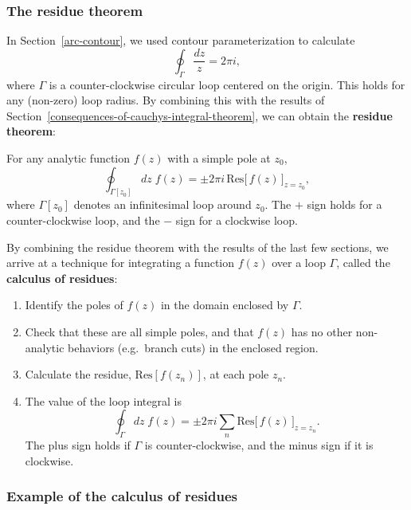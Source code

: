 \documentclass[10pt,a4paper]{article}
\begin{document}
\subsubsection{The residue theorem}
\label{the-residue-theorem}

In Section~\ref{arc-contour}, we used contour parameterization to
calculate
\begin{equation}
\oint_{\Gamma} \frac{dz}{z} = 2\pi i,
\end{equation}
where $\Gamma$ is a counter-clockwise circular loop centered on the
origin. This holds for any (non-zero) loop radius. By combining this
with the results of
Section~\ref{consequences-of-cauchys-integral-theorem}, we can obtain
the \textbf{residue theorem}:

\begin{framed}
  \noindent
  For any analytic function $f(z)$ with a simple pole at $z_0$,
  \begin{equation}
    \oint_{\Gamma[z_0]} dz \; f(z) = \pm 2\pi i \, \mathrm{Res}\big[\,f(z)\,\big]_{z = z_0},
  \end{equation}
  where $\Gamma[z_0]$ denotes an infinitesimal loop around $z_0$. The
  $+$ sign holds for a counter-clockwise loop, and the $-$ sign for a
  clockwise loop.
\end{framed}

\noindent
By combining the residue theorem with the results of the last few
sections, we arrive at a technique for integrating a function $f(z)$
over a loop $\Gamma$, called the \textbf{calculus of residues}:

\begin{enumerate}
\item
  Identify the poles of $f(z)$ in the domain enclosed by $\Gamma$.
\item
  Check that these are all simple poles, and that $f(z)$ has no other
  non-analytic behaviors (e.g.~branch cuts) in the enclosed region.
\item
  Calculate the residue, $\mathrm{Res}[f(z_n)]$, at each pole $z_n$.
\item
  The value of the loop integral is
  \begin{equation}
\oint_\Gamma dz\; f(z) = \pm 2\pi i \sum_n \mathrm{Res}\big[\,f(z)\,\big]_{z = z_n}.
\end{equation}The
  plus sign holds if $\Gamma$ is counter-clockwise, and the minus sign
  if it is clockwise.
\end{enumerate}

\subsubsection{Example of the calculus of residues}
\label{residues-example}
\end{document}
